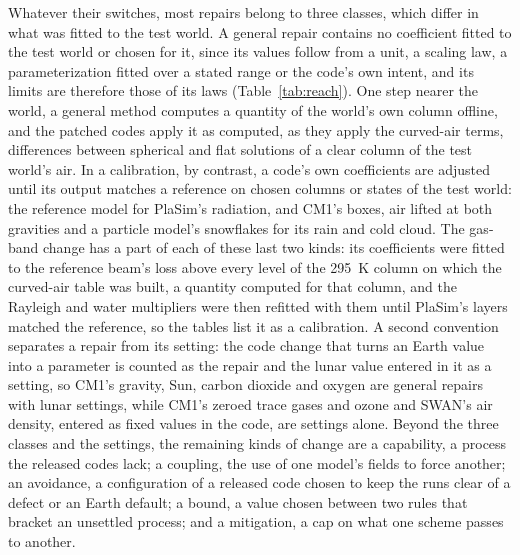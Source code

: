 Whatever their switches, most repairs belong to three classes, which differ in what was fitted to the test
world. A general repair contains no coefficient fitted to the test world or chosen for it, since its values
follow from a unit, a scaling law, a parameterization fitted over a stated range or the code's own intent, and
its limits are therefore those of its laws (Table~\ref{tab:reach}). One step nearer the world, a general method
computes a quantity of the world's own column offline, and the patched codes apply it as computed, as they apply the curved-air terms, differences between spherical and flat solutions of a clear column of the test world's air. In a calibration, by contrast, a code's
own coefficients are adjusted until its output matches a reference on chosen columns or states of the test world:
the reference model for PlaSim's radiation, and CM1's boxes, air lifted at both gravities and a particle model's
snowflakes for its rain and cold cloud.
The gas-band change has a part of each of these last two kinds: its coefficients were fitted to the reference
beam's loss above every level of the 295~K column on which the curved-air table was built, a quantity computed for that column, and the Rayleigh and
water multipliers were then refitted with them until PlaSim's layers matched the reference, so the tables list it as a calibration. A second convention separates a repair from its setting: the code change that turns an
Earth value into a parameter is counted as the repair and the lunar value entered in it as a setting, so CM1's
gravity, Sun, carbon dioxide and oxygen are general repairs with lunar settings, while CM1's zeroed trace gases
and ozone and SWAN's air density, entered as fixed values in the code, are settings alone. Beyond the three
classes and the settings, the remaining kinds of change are a capability, a process the released codes lack; a
coupling, the use of one model's fields to force another; an avoidance, a configuration of a released code
chosen to keep the runs clear of a defect or an Earth default; a bound, a value chosen between two rules that
bracket an unsettled process; and a mitigation, a cap on what one scheme passes to another.

